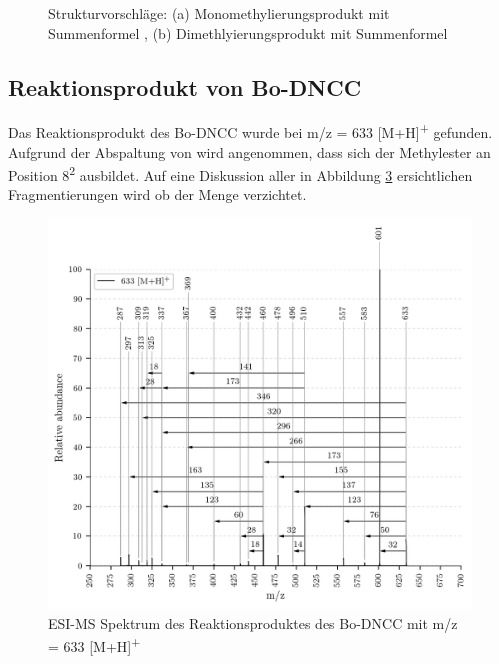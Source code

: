 \begin{figure}[!htbp]
\begin{subfigure}[b]{0.5\textwidth}
    \caption{}
    \label{fig:645MHStruktur}
  \end{subfigure}
  \caption[Strukturvorschläge für das Mono- und Dimethylierungsprodukt des Bo-DYCC, Quelle: Autor]{Strukturvorschläge: (a) Monomethylierungsprodukt mit Summenformel , (b) Dimethlyierungsprodukt mit Summenformel }
\end{figure}

\subsection{Reaktionsprodukt von Bo-DNCC}

Das Reaktionsprodukt des Bo-DNCC wurde bei m/z = 633 [M+H]\textsuperscript{+} gefunden. Aufgrund der Abspaltung von  wird angenommen, dass sich der Methylester an Position 8\textsuperscript{2} ausbildet. Auf eine Diskussion aller in Abbildung \ref{fig:633MH} ersichtlichen Fragmentierungen wird ob der Menge verzichtet.

\begin{figure}[!htbp]
  \centering
  \includegraphics[width=\textwidth, height=0.7\textwidth]{figures/Kapitel7/Kataboliten/VWA_MS_633.png}
  \caption[ESI-MS Spektrum des Reaktionsproduktes von Bo-DNCC, Quelle: Autor]{ESI-MS Spektrum des Reaktionsproduktes des Bo-DNCC mit m/z = 633 [M+H]\textsuperscript{+}}
  \label{fig:633MH}
\end{figure}

